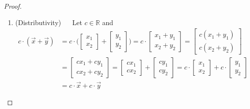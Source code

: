 \begin{proof}
\begin{enumerate}
\item (Distributivity) 
 ~~ Let $c \in \mathbb{R}$ and 
% 
\begin{align*}
 c \cdot (\vec{x} + \vec{y}) & = 
 c \cdot \biggl( 
\begin{bmatrix}
 x_1 \\ x_2 
\end{bmatrix} + 
\begin{bmatrix}
 y_1 \\ y_2 
\end{bmatrix} \biggr) 
= c\cdot 
\begin{bmatrix}
 x_1 + y_1 \\
 x_2 + y_2 
\end{bmatrix} 
= 
\begin{bmatrix}
 c (x_1 +y_1) \\ c (x_2 + y_2) 
\end{bmatrix} \\
& = 
\begin{bmatrix}
 c x_1 + c y_1 \\
 c x_2 + c y_2 
\end{bmatrix} 
= 
\begin{bmatrix}
 c x_1 \\ c x_2 
\end{bmatrix} + 
\begin{bmatrix}
 c y_1 \\ c y_2 
\end{bmatrix} 
= c \cdot 
\begin{bmatrix}
 x_1 \\ x_2 
\end{bmatrix}
+ c \cdot 
\begin{bmatrix}
 y_1 \\ y_2 
\end{bmatrix} \\
& = c\cdot  \vec{x} + c\cdot  \vec{y} 
\end{align*}


\end{enumerate}
\end{proof}
